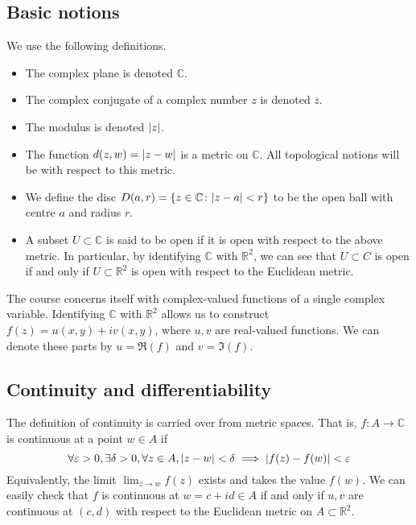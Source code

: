 \subsection{Basic notions}
We use the following definitions.
\begin{itemize}
	\item The complex plane is denoted \( \mathbb C \).
	\item The complex conjugate of a complex number \( z \) is denoted \( \overline z \).
	\item The modulus is denoted \( \abs{z} \).
	\item The function \( d(z,w) = \abs{z - w} \) is a metric on \( \mathbb C \).
	      All topological notions will be with respect to this metric.
	\item We define the disc \( D(a,r) = \qty{z \in \mathbb C \colon \abs{z-a}<r} \) to be the open ball with centre \( a \) and radius \( r \).
	\item A subset \( U \subset \mathbb C \) is said to be open if it is open with respect to the above metric.
	      In particular, by identifying \( \mathbb C \) with \( \mathbb R^2 \), we can see that \( U \subset C \) is open if and only if \( U \subset \mathbb R^2 \) is open with respect to the Euclidean metric.
\end{itemize}
The course concerns itself with complex-valued functions of a single complex variable.
Identifying \( \mathbb C \) with \( \mathbb R^2 \) allows us to construct \( f(z) = u(x,y) + i v(x,y) \), where \( u,v \) are real-valued functions.
We can denote these parts by \( u = \Re(f) \) and \( v = \Im(f) \).

\subsection{Continuity and differentiability}
The definition of continuity is carried over from metric spaces.
That is, \( f \colon A \to \mathbb C \) is continuous at a point \( w \in A \) if
\[
	\forall \varepsilon > 0, \exists \delta > 0, \forall z \in A, \abs{z-w} < \delta \implies \abs{f(z) - f(w)} < \varepsilon
\]
Equivalently, the limit \( \lim_{z \to w} f(z) \) exists and takes the value \( f(w) \).
We can easily check that \( f \) is continuous at \( w = c + id \in A \) if and only if \( u, v \) are continuous at \( (c,d) \) with respect to the Euclidean metric on \( A \subset \mathbb R^2 \).

